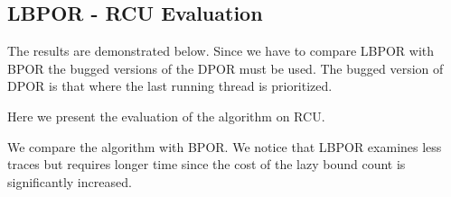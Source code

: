 \subsection{LBPOR - RCU Evaluation}

The results are demonstrated below. Since we have to compare LBPOR with BPOR the bugged versions of the DPOR must be used. The bugged version
of DPOR is that where the last running thread is prioritized.

Here we present the evaluation of the algorithm on RCU.




We compare the algorithm with BPOR. We notice that LBPOR examines less traces but requires longer time since the cost of the lazy bound count is significantly
increased.


